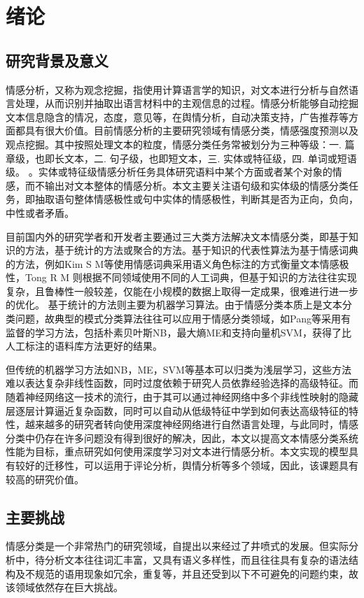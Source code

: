 \chapter{绪论}

\section{研究背景及意义}
情感分析，又称为观念挖掘，指使用计算语言学的知识，对文本进行分析与自然语言处理，从而识别并抽取出语言材料中的主观信息的过程\cite{Tejwani2014}。情感分析能够自动挖掘文本信息隐含的情况，态度，意见等，在舆情分析，自动决策支持，广告推荐等方面都具有很大价值\cite{Zhang2016}。目前情感分析的主要研究领域有情感分类，情感强度预测以及观点挖掘\cite{Tejwani2014}。其中按照处理文本的粒度，情感分类任务常被划分为三种等级：一. 篇章级，也即长文本，二. 句子级，也即短文本，三. 实体或特征级，四. 单词或短语级。\cite{Zhang2016} \cite{Liu2016} \cite{Zhao2010}。实体或特征级情感分析任务具体研究语料中某个方面或者某个对象的情感，而不输出对文本整体的情感分析。本文主要关注语句级和实体级的情感分类任务，即抽取语句整体情感极性或句中实体的情感极性，判断其是否为正向，负向，中性或者矛盾。

目前国内外的研究学者和开发者主要通过三大类方法解决文本情感分类，即基于知识的方法，基于统计的方法或聚合的方法\cite{Zong2013}。基于知识的代表性算法为基于情感词典的方法，例如Kim S M等\cite{Kim2006}使用情感词典采用语义角色标注的方式衡量文本情感极性，Tong R M \cite{Tong2001}则根据不同领域使用不同的人工词典，但基于知识的方法往往实现复杂，且鲁棒性一般较差，仅能在小规模的数据上取得一定成果，很难进行进一步的优化\cite{Zong2013}。
基于统计的方法则主要为机器学习算法。由于情感分类本质上是文本分类问题，故典型的模式分类算法往往可以应用于情感分类领域，如Pang等\cite{bopang2002}采用有监督的学习方法，包括朴素贝叶斯NB，最大熵ME和支持向量机SVM，获得了比人工标注的语料库方法更好的结果。

但传统的机器学习方法如NB，ME，SVM等基本可以归类为浅层学习，这些方法难以表达复杂非线性函数，同时过度依赖于研究人员依靠经验选择的高级特征。而随着神经网络这一技术的流行，由于其可以通过神经网络中多个非线性映射的隐藏层逐层计算逼近复杂函数，同时可以自动从低级特征中学到如何表达高级特征的特性，越来越多的研究者转向使用深度神经网络进行自然语言处理，与此同时，情感分类中仍存在许多问题没有得到很好的解决，因此，本文以提高文本情感分类系统性能为目标，重点研究如何使用深度学习对文本进行情感分析。本文实现的模型具有较好的迁移性，可以运用于评论分析，舆情分析等多个领域，因此，该课题具有较高的研究价值。
\section{主要挑战}
情感分类是一个非常热门的研究领域，自提出以来经过了井喷式的发展\cite{Liu2016}。但实际分析中，待分析文本往往词汇丰富，又具有语义多样性，而且往往具有复杂的语法结构及不规范的语用现象如冗余，重复等\cite{Zong2013}，并且还受到以下不可避免的问题约束，故该领域依然存在巨大挑战。

